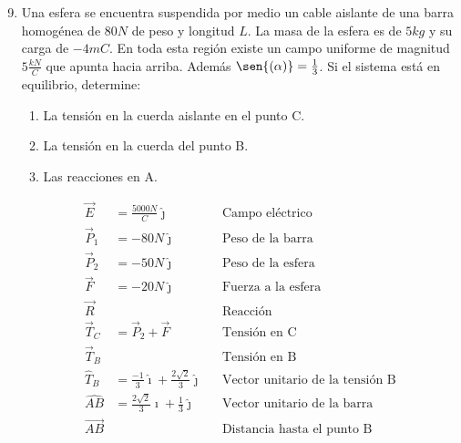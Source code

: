 \documentclass[12pt, twoside]{article}
\begin{document}
\begin{enumerate}
	\setcounter{enumi}{8}
	\item Una esfera se encuentra suspendida por medio un cable aislante
		de una barra homogénea de $80N$ de peso y longitud $L$.
		La masa de la esfera es de $5kg$ y su carga de $-4mC$.
		En toda esta región existe un campo uniforme de magnitud $5 \frac{kN}{C}$
		que apunta hacia arriba.
		Además $\sen{(\alpha)}=\frac{1}{3}$.
		Si el sistema está en equilibrio, determine:
		\begin{enumerate}
			\item La tensión en la cuerda aislante en el punto C.

			\item La tensión en la cuerda del punto B.

			\item Las reacciones en A.
		\end{enumerate}
		\begin{align*}
			\vec{E} &= \frac{5000N}{C} \hat{\jmath} && \text{Campo eléctrico}\\
			\vec{P}_1 &= -80N\hat{\jmath} && \text{Peso de la barra}\\
			\vec{P}_2 &= -50N\hat{\jmath} && \text{Peso de la esfera}\\
			\vec{F} &= -20N \hat{\jmath} && \text{Fuerza a la esfera}\\
			\vec{R} & && \text{Reacción}\\
			\vec{T}_C &= \vec{P}_2 + \vec{F} && \text{Tensión en C}\\
			\vec{T}_B & && \text{Tensión en B}\\
			\hat{T}_B &= \frac{-1}{3} \hat{\imath}+
			\frac{2\sqrt{2}}{3} \hat{\jmath} && \text{Vector unitario de la tensión B}\\
			\hat{AB} &= \frac{2\sqrt{2}}{3} \hat{\imath}+
			\frac{1}{3} \hat{\jmath} && \text{Vector unitario de la barra}\\
			\vec{AB} & && \text{Distancia hasta el punto B}
		\end{align*}


\end{enumerate}
\end{document}
